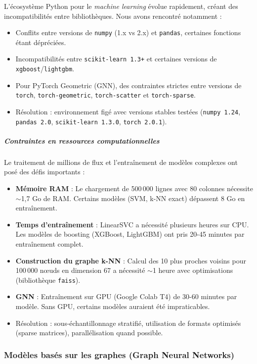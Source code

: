 ﻿\documentclass[11pt,a4paper]{article}
\begin{document}
L'écosystème Python pour le \emph{machine learning} évolue rapidement, créant des incompatibilités entre bibliothèques. Nous avons rencontré notamment :
\begin{itemize}
    \item Conflits entre versions de \texttt{numpy} (1.x vs 2.x) et \texttt{pandas}, certaines fonctions étant dépréciées.
    \item Incompatibilités entre \texttt{scikit-learn 1.3+} et certaines versions de \texttt{xgboost}/\texttt{lightgbm}.
    \item Pour PyTorch Geometric (GNN), des contraintes strictes entre versions de \texttt{torch}, \texttt{torch-geometric}, \texttt{torch-scatter} et \texttt{torch-sparse}.
    \item Résolution : environnement figé avec versions stables testées (\texttt{numpy 1.24}, \texttt{pandas 2.0}, \texttt{scikit-learn 1.3.0}, \texttt{torch 2.0.1}).
\end{itemize}

\subparagraph{Contraintes en ressources computationnelles}

Le traitement de millions de flux et l'entraînement de modèles complexes ont posé des défis importants :
\begin{itemize}
    \item \textbf{Mémoire RAM} : Le chargement de 500\,000 lignes avec 80 colonnes nécessite $\sim$1,7 Go de RAM. Certains modèles (SVM, k-NN exact) dépassent 8 Go en entraînement.
    \item \textbf{Temps d'entraînement} : LinearSVC a nécessité plusieurs heures sur CPU. Les modèles de boosting (XGBoost, LightGBM) ont pris 20-45 minutes par entraînement complet.
    \item \textbf{Construction du graphe k-NN} : Calcul des 10 plus proches voisins pour 100\,000 nœuds en dimension 67 a nécessité $\sim$1 heure avec optimisations (bibliothèque \texttt{faiss}).
    \item \textbf{GNN} : Entraînement sur GPU (Google Colab T4) de 30-60 minutes par modèle. Sans GPU, certains modèles auraient été impraticables.
    \item Résolution : sous-échantillonnage stratifié, utilisation de formats optimisés (sparse matrices), parallélisation quand possible.
\end{itemize}

\subsubsection{Modèles basés sur les graphes (Graph Neural Networks)}
\end{document}

